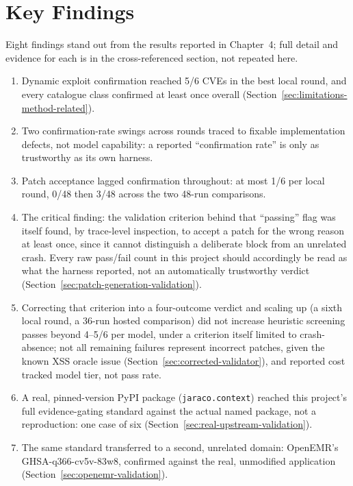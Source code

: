 \documentclass[12pt,a4paper]{report}
\begin{document}
\section{Key Findings}

Eight findings stand out from the results reported in Chapter~4; full detail and evidence for each is in the cross-referenced section, not repeated here.

\begin{enumerate}
\item Dynamic exploit confirmation reached 5/6 CVEs in the best local round, and every catalogue class confirmed at least once overall (Section~\ref{sec:limitations-method-related}).

\item Two confirmation-rate swings across rounds traced to fixable implementation defects, not model capability: a reported ``confirmation rate'' is only as trustworthy as its own harness.

\item Patch acceptance lagged confirmation throughout: at most 1/6 per local round, 0/48 then 3/48 across the two 48-run comparisons.

\item The critical finding: the validation criterion behind that ``passing'' flag was itself found, by trace-level inspection, to accept a patch for the wrong reason at least once, since it cannot distinguish a deliberate block from an unrelated crash. Every raw pass/fail count in this project should accordingly be read as what the harness reported, not an automatically trustworthy verdict (Section~\ref{sec:patch-generation-validation}).

\item Correcting that criterion into a four-outcome verdict and scaling up (a sixth local round, a 36-run hosted comparison) did not increase heuristic screening passes beyond 4--5/6 per model, under a criterion itself limited to crash-absence; not all remaining failures represent incorrect patches, given the known XSS oracle issue (Section~\ref{sec:corrected-validator}), and reported cost tracked model tier, not pass rate.

\item A real, pinned-version PyPI package (\texttt{jaraco.context}) reached this project's full evidence-gating standard against the actual named package, not a reproduction: one case of six (Section~\ref{sec:real-upstream-validation}).

\item The same standard transferred to a second, unrelated domain: OpenEMR's GHSA-q366-cv5v-83w8, confirmed against the real, unmodified application (Section~\ref{sec:openemr-validation}).


\end{enumerate}
\end{document}
